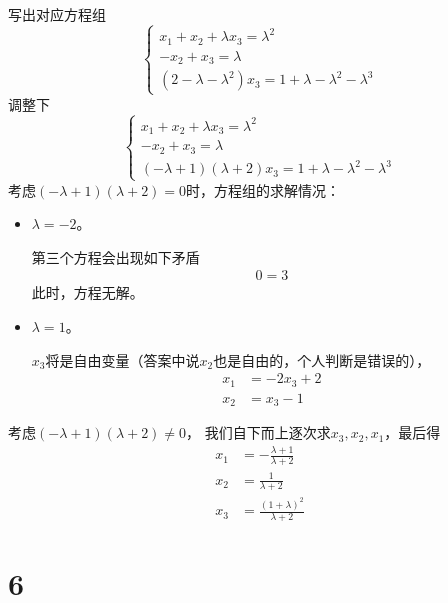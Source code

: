 \documentclass{article}
\begin{document}
写出对应方程组
\begin{equation*}
  \begin{cases}
    x_1 + x_2 +\lambda x_3 = \lambda^2 \\
    - x_2 + x_3 = \lambda              \\
    (2 - \lambda - \lambda^2)x_3 = 1 + \lambda - \lambda^2 - \lambda^3
  \end{cases}
\end{equation*}
调整下
\begin{equation*}
  \begin{cases}
    x_1 + x_2 +\lambda x_3 = \lambda^2 \\
    - x_2 + x_3 = \lambda              \\
    (- \lambda  + 1)(\lambda + 2)x_3 = 1 + \lambda - \lambda^2 - \lambda^3
  \end{cases}
\end{equation*}
考虑$(- \lambda  + 1)(\lambda + 2) = 0$时，方程组的求解情况：

\begin{itemize}
  \item $\lambda = -2$。

        第三个方程会出现如下矛盾
        \begin{align*}
          0 = 3
        \end{align*}
        此时，方程无解。

  \item $\lambda = 1$。

        $x_3$将是自由变量（答案中说$x_2$也是自由的，个人判断是错误的），
        \begin{align*}
          x_1 & = -2x_3 + 2 \\
          x_2 & = x_3 - 1
        \end{align*}
\end{itemize}

考虑$(- \lambda  + 1)(\lambda + 2) \neq 0$，
我们自下而上逐次求$x_3,x_2,x_1$，最后得
\begin{align*}
  x_1 & = - \frac{\lambda + 1}{\lambda + 2}   \\
  x_2 & = \frac{1}{\lambda + 2}               \\
  x_3 & = \frac{(1 + \lambda)^2}{\lambda + 2}
\end{align*}

\section*{6}
\end{document}
